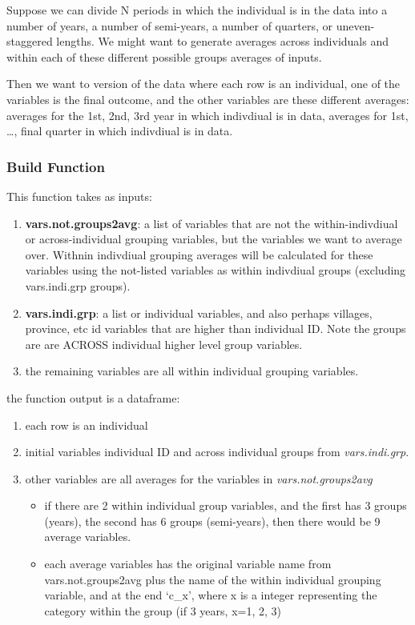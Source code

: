 \documentclass[
]{book}
\providecommand{\tightlist}{%
  \setlength{\itemsep}{0pt}\setlength{\parskip}{0pt}}
\begin{document}
Suppose we can divide N periods in which the individual is in the data into a number of years, a number of semi-years, a number of quarters, or uneven-staggered lengths. We might want to generate averages across individuals and within each of these different possible groups averages of inputs.

Then we want to version of the data where each row is an individual, one of the variables is the final outcome, and the other variables are these different averages: averages for the 1st, 2nd, 3rd year in which indivdiual is in data, averages for 1st, \ldots, final quarter in which indivdiual is in data.

\hypertarget{build-function}{%
\subsubsection{Build Function}\label{build-function}}

This function takes as inputs:

\begin{enumerate}
\def\labelenumi{\arabic{enumi}.}
\tightlist
\item
  \textbf{vars.not.groups2avg}: a list of variables that are not the within-indivdiual or across-individual grouping variables, but the variables we want to average over. Withnin indivdiual grouping averages will be calculated for these variables using the not-listed variables as within indivdiual groups (excluding vars.indi.grp groups).
\item
  \textbf{vars.indi.grp}: a list or individual variables, and also perhaps villages, province, etc id variables that are higher than individual ID. Note the groups are are ACROSS individual higher level group variables.
\item
  the remaining variables are all within individual grouping variables.
\end{enumerate}

the function output is a dataframe:

\begin{enumerate}
\def\labelenumi{\arabic{enumi}.}
\tightlist
\item
  each row is an individual
\item
  initial variables individual ID and across individual groups from \emph{vars.indi.grp}.
\item
  other variables are all averages for the variables in \emph{vars.not.groups2avg}

  \begin{itemize}
  \tightlist
  \item
    if there are 2 within individual group variables, and the first has 3 groups (years), the second has 6 groups (semi-years), then there would be 9 average variables.
  \item
    each average variables has the original variable name from vars.not.groups2avg plus the name of the within individual grouping variable, and at the end `c\_x', where x is a integer representing the category within the group (if 3 years, x=1, 2, 3)
  \end{itemize}
\end{enumerate}
\end{document}
